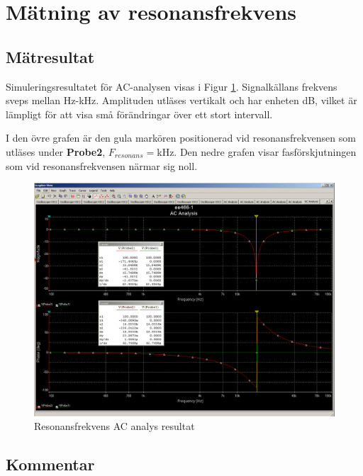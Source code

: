 \documentclass[11pt,a4paper]{article}
\begin{document}
\section{Mätning av resonansfrekvens}\label{}

\subsection{Mätresultat}\label{}
Simuleringsresultatet för AC-analysen visas i Figur \ref{fig:7-ACanalysis}.
Signalkällans frekvens sveps mellan \unit[100]{\si{\Hz}}-\unit[100]{\si{\kHz}}.
Amplituden utläses vertikalt och har enheten \si{\dB}, vilket är lämpligt för
att visa små förändringar över ett stort intervall.
\par I den övre grafen är den gula markören positionerad vid resonansfrekvensen
som utläses under \textbf{Probe2}, $F_{resonans} = $\unit[15,8489]{\si{\kHz}}.
Den nedre grafen visar fasförskjutningen som vid resonansfrekvensen närmar sig noll.


\begin{figure}
    \centering
    \includegraphics[width=1.25\linewidth]{ee466multisim/7-ACanalysis}
    \caption{Resonansfrekvens AC analys resultat}
    \label{fig:7-ACanalysis}
\end{figure}



\subsection{Kommentar}\label{}
\end{document}
